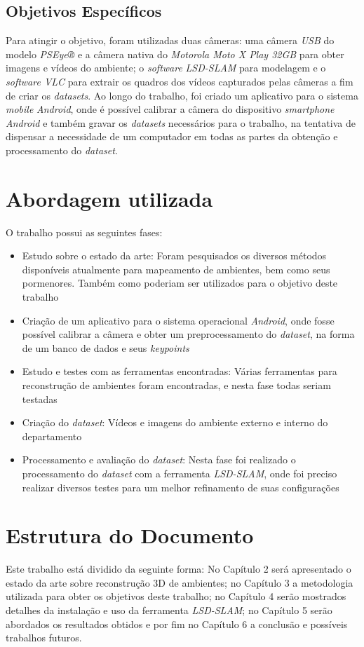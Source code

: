 \subsection{Objetivos Específicos}

Para atingir o objetivo, foram utilizadas duas câmeras: uma câmera \textit{USB} do modelo \textit{PSEye®} e a câmera nativa do  \textit{Motorola Moto X Play 32GB} para obter imagens e vídeos do ambiente; o \textit{software} \textit{LSD-SLAM} \cite{LSD-SLAM-Artigo} para modelagem e o \textit{software VLC} para extrair os quadros dos vídeos capturados pelas câmeras a fim de criar os \textit{datasets}. Ao longo do trabalho, foi criado um aplicativo para o sistema \textit{mobile} \textit{Android}, onde é possível calibrar a câmera do dispositivo \textit{smartphone Android} e também gravar os \textit{datasets} necessários para o trabalho, na tentativa de dispensar a necessidade de um computador em todas as partes da obtenção e processamento do \textit{dataset}.


\section{Abordagem utilizada}

O trabalho possui as seguintes fases:
\begin{itemize}
\item{Estudo sobre o estado da arte: Foram pesquisados os diversos métodos disponíveis atualmente para mapeamento de ambientes, bem como seus pormenores. Também como  poderiam ser utilizados para o objetivo deste trabalho}
\item{Criação de um aplicativo para o sistema operacional \textit{Android}, onde fosse possível calibrar a câmera e obter um preprocessamento do \textit{dataset}, na forma de um banco de dados e seus \textit{keypoints}}
\item{Estudo e testes com as ferramentas encontradas: Várias ferramentas para reconstrução de ambientes foram encontradas, e nesta fase todas seriam testadas}
\item{Criação do \textit{dataset}: Vídeos e imagens do ambiente externo e interno do departamento}
\item{Processamento e avaliação do \textit{dataset}: Nesta fase foi realizado o processamento do \textit{dataset} com a ferramenta \textit{LSD-SLAM}, onde foi preciso realizar diversos testes para um melhor refinamento de suas configurações}
\end{itemize}


\section{Estrutura do Documento}


Este trabalho está dividido da seguinte forma: No Capítulo 2 será apresentado o estado da arte sobre reconstrução 3D de ambientes; no Capítulo 3 a metodologia utilizada para obter os objetivos deste trabalho; no Capítulo 4 serão mostrados detalhes da instalação e uso da ferramenta \textit{LSD-SLAM}; no Capítulo 5 serão abordados os resultados obtidos e por fim no Capítulo 6 a conclusão e possíveis trabalhos futuros.
